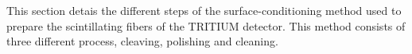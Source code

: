 This section detais the different steps of the surface-conditioning method used to prepare the scintillating fibers of the TRITIUM detector. This method consists of three different process, cleaving, polishing and cleaning.
